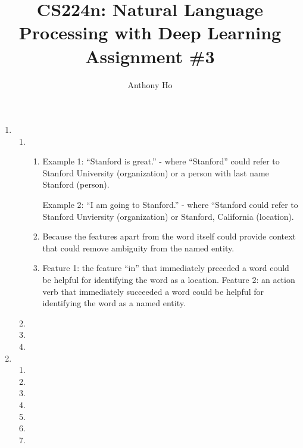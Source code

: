 \documentclass[10pt,reqno]{amsart}
\begin{document}
\title{CS224n: Natural Language Processing with Deep Learning\\Assignment \#3}
\author{Anthony Ho}
\maketitle


\newcommand{\f}{\frac}
\newcommand{\pd}[1]{\frac{\partial}{\partial #1}}
\newcommand{\pdd}[2]{\frac{\partial #1}{\partial #2}}
\newcommand{\softmax}{\text{softmax}}


\renewcommand{\labelenumi}{\arabic{enumi}.}
\begin{enumerate}[topsep=0pt,itemsep=3ex,partopsep=1ex,parsep=1ex]


\item
  \begin{enumerate}[itemsep=2ex]
  \item 
    \begin{enumerate}[itemsep=2ex]
      \item
        Example 1: ``Stanford is great.'' - where ``Stanford'' could refer to 
        Stanford University (organization) or a person with last name Stanford (person).

        Example 2: ``I am going to Stanford.'' - where ``Stanford could refer to 
        Stanford Unviersity (organization) or Stanford, California (location).
      \item Because the features apart from the word itself could provide context 
        that could remove ambiguity from the named entity.
      \item
        Feature 1: the feature ``in'' that immediately preceded a word could be helpful 
        for identifying the word as a location.
        Feature 2: an action verb that immediately succeeded a word could be helpful 
        for identifying the word as a named entity.
    \end{enumerate}
  \item 
  \item %
  \item 
  \end{enumerate}


\item
  \begin{enumerate}[itemsep=2ex]
  \item 
  \item 
  \item %
  \item 
  \item %
  \item %
  \item 
  \end{enumerate}



\end{enumerate}
\end{document}
